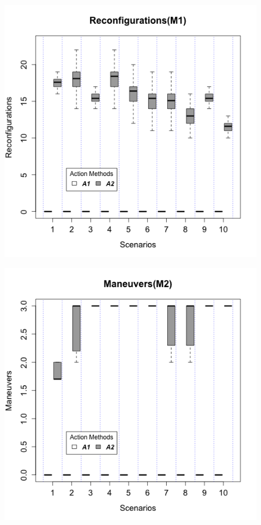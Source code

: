 \begin{figure}
\centering
\begin{minipage}{.5\textwidth}
  \centering
  \includegraphics[width=0.95\linewidth]{img/graphs/Boxplot_M1.png}
  \label{fig:m1}
\end{minipage}%
\begin{minipage}{.5\textwidth}
  \centering
  \includegraphics[width=0.95\linewidth]{img/graphs/Boxplot_M2.png}
  \label{fig:m2}
\end{minipage}
\end{figure}



